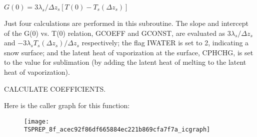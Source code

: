 $G(0) = 3 \lambda_s / \Delta z_s [T(0) - T_s(\Delta z_s)]$

Just four calculations are performed in this subroutine. The slope and intercept of the G(0) vs. T(0) relation, G\+C\+O\+E\+F\+F and G\+C\+O\+N\+S\+T, are evaluated as $3 \lambda_s / \Delta z_s$ and $-3 \lambda_s T_s(\Delta z_s)/ \Delta z_s$ respectively; the flag I\+W\+A\+T\+E\+R is set to 2, indicating a snow surface; and the latent heat of vaporization at the surface, C\+P\+H\+C\+H\+G, is set to the value for sublimation (by adding the latent heat of melting to the latent heat of vaporization).


\begin{DoxyItemize}
\item C\+A\+L\+C\+U\+L\+A\+T\+E C\+O\+E\+F\+F\+I\+C\+I\+E\+N\+T\+S.
\end{DoxyItemize}

Here is the caller graph for this function\+:\nopagebreak
\begin{figure}[H]
\begin{center}
\leavevmode
\texttt{[image: TSPREP\_8f\_acec92f86df665884ec221b869cfa7f7a\_icgraph]}
\end{center}
\end{figure}


